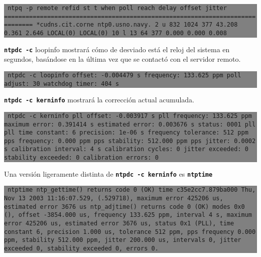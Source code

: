 \documentclass[12pt]{article}
\begin{document}
\colorbox{grey}{\parbox[t]{0.95\linewidth}{ \vspace*{0.5cm} {\tt      
ntpq -p
remote           refid      st t when poll reach   delay   offset  jitter
==============================================================================
*cudns.cit.corne ntp0.usno.navy.  2 u  832 1024  377   43.208    0.361   2.646
 LOCAL(0)        LOCAL(0)        10 l   13   64  377    0.000    0.000   0.008
 } \vspace*{0.5cm} } } 

	
\texttt{\textbf{ntpdc -c}} loopinfo mostrará cómo de desviado está el reloj del sistema
en segundos, basándose en la última vez que se contactó con el servidor 
remoto.



\colorbox{grey}{\parbox[t]{0.95\linewidth}{ \vspace*{0.5cm} {\tt 
ntpdc -c loopinfo
offset:               -0.004479 s
frequency:            133.625 ppm
poll adjust:          30
watchdog timer:       404 s
 } \vspace*{0.5cm} } } 

	
\texttt{\textbf{ntpdc -c kerninfo}}  mostrará la corrección actual acumulada.


\colorbox{grey}{\parbox[t]{0.95\linewidth}{ \vspace*{0.5cm} {\tt 
ntpdc -c kerninfo
pll offset:           -0.003917 s
pll frequency:        133.625 ppm
maximum error:        0.391414 s
estimated error:      0.003676 s
status:               0001  pll
pll time constant:    6
precision:            1e-06 s
frequency tolerance:  512 ppm
pps frequency:        0.000 ppm
pps stability:        512.000 ppm
pps jitter:           0.0002 s
calibration interval: 4 s
calibration cycles:   0
jitter exceeded:      0
stability exceeded:   0
calibration errors:   0
 } \vspace*{0.5cm} } } 

	
Una versión ligeramente distinta de \texttt{\textbf{ntpdc -c kerninfo}} es \texttt{\textbf{ntptime}}


\colorbox{grey}{\parbox[t]{0.95\linewidth}{ \vspace*{0.5cm} {\tt 
ntptime
ntp\_gettime() returns code 0 (OK)
  time c35e2cc7.879ba000  Thu, Nov 13 2003 11:16:07.529, (.529718),
  maximum error 425206 us, estimated error 3676 us
ntp\_adjtime() returns code 0 (OK)
  modes 0x0 (),
  offset -3854.000 us, frequency 133.625 ppm, interval 4 s,
  maximum error 425206 us, estimated error 3676 us,
  status 0x1 (PLL),
  time constant 6, precision 1.000 us, tolerance 512 ppm,
  pps frequency 0.000 ppm, stability 512.000 ppm, jitter 200.000 us,
  intervals 0, jitter exceeded 0, stability exceeded 0, errors 0.
 } \vspace*{0.5cm} } } 
\end{document}
